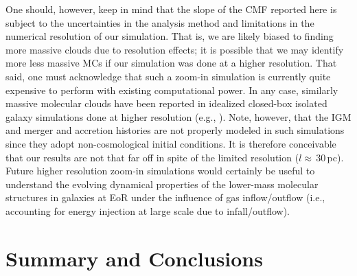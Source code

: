 \IfFileExists{emulateapjlegacy.cls}{\documentclass[iop]{emulateapjlegacy}}{\documentclass[iop]{emulateapj}}
\begin{document}
One should, however, keep in mind that 
the slope of the CMF reported here is subject
to the uncertainties in the analysis method and limitations in the numerical resolution of our simulation. 
That is, we are likely biased to finding more massive clouds due to resolution effects; 
it is possible that we may identify more less massive MCs if our simulation 
was done at a higher resolution. 
That said, one must acknowledge that such a zoom-in simulation is currently quite expensive to perform with 
existing computational power.
In any case, similarly massive molecular clouds have been reported in idealized closed-box isolated galaxy 
simulations done at higher resolution (e.g., \citealt{Behrendt16a}). 
Note, however, that the IGM and merger and accretion histories are not properly modeled in such simulations 
since they adopt non-cosmological initial conditions. 
It is therefore conceivable that our results are not that far off in spite of the limited resolution ($l\approx$\,30\,pc).
Future higher resolution zoom-in simulations would certainly be useful to understand
the evolving dynamical properties of the lower-mass molecular structures in
galaxies at EoR under the influence of gas inflow/outflow (i.e., accounting for energy injection at large scale due to infall/outflow).


\section{Summary and Conclusions}      \label{sec:conclusion}
\end{document}
